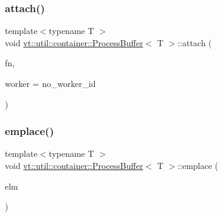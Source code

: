 \subsubsection{\texorpdfstring{attach()}{attach()}}
{\footnotesize\ttfamily template$<$typename T $>$ \\
void \hyperlink{structvt_1_1util_1_1container_1_1_process_buffer}{vt\+::util\+::container\+::\+Process\+Buffer}$<$ T $>$\+::attach (\begin{DoxyParamCaption}\item[{\hyperlink{structvt_1_1util_1_1container_1_1_process_buffer_a20be3480fb453096015a6fe5ca370816}{Process\+Fn\+Type}}]{fn,  }\item[{\hyperlink{namespacevt_a656e362091da17b9b93d0655b36e3392}{Worker\+I\+D\+Type}}]{worker = {\ttfamily no\+\_\+worker\+\_\+id} }\end{DoxyParamCaption})\hspace{0.3cm}{\ttfamily [inline]}}

\mbox{\label{structvt_1_1util_1_1container_1_1_process_buffer_ae1bff94f45b85fa126a63b98c6c2e869}} 
\subsubsection{\texorpdfstring{emplace()}{emplace()}}
{\footnotesize\ttfamily template$<$typename T $>$ \\
void \hyperlink{structvt_1_1util_1_1container_1_1_process_buffer}{vt\+::util\+::container\+::\+Process\+Buffer}$<$ T $>$\+::emplace (\begin{DoxyParamCaption}\item[{T \&\&}]{elm }\end{DoxyParamCaption})\hspace{0.3cm}{\ttfamily [inline]}}

\mbox{\label{structvt_1_1util_1_1container_1_1_process_buffer_aae71d070e3eb87d11a7cd5442aacdaed}} 

